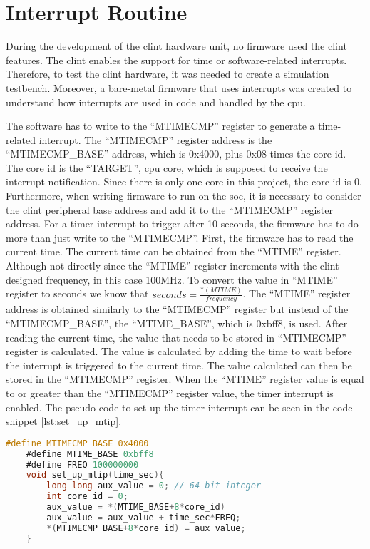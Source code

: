 \section{Interrupt Routine}
\label{section:barebones_interrupt_routine}
During the development of the \acrshort{clint} hardware unit, no firmware used the \acrshort{clint} features. The \acrshort{clint} enables the support for time or software-related interrupts. Therefore, to test the \acrshort{clint} hardware, it was needed to create a simulation testbench. Moreover, a bare-metal firmware that uses interrupts was created to understand how interrupts are used in code and handled by the \acrshort{cpu}.

The software has to write to the \enquote{MTIMECMP} register to generate a time-related interrupt. The \enquote{MTIMECMP} register address is the \enquote{MTIMECMP\_BASE} address, which is 0x4000, plus 0x08 times the core id. The core id is the \enquote{TARGET}, \acrshort{cpu} core, which is supposed to receive the interrupt notification. Since there is only one core in this project, the core id is 0. Furthermore, when writing firmware to run on the \acrshort{soc}, it is necessary to consider the \acrshort{clint} peripheral base address and add it to the \enquote{MTIMECMP} register address. For a timer interrupt to trigger after 10 seconds, the firmware has to do more than just write to the \enquote{MTIMECMP}. First, the firmware has to read the current time. The current time can be obtained from the \enquote{MTIME} register. Although not directly since the \enquote{MTIME} register increments with the \acrshort{clint} designed frequency, in this case 100MHz. To convert the value in \enquote{MTIME} register to seconds we know that $seconds=\frac{*(MTIME)}{frequency}$. The \enquote{MTIME} register address is obtained similarly to the \enquote{MTIMECMP} register but instead of the \enquote{MTIMECMP\_BASE}, the \enquote{MTIME\_BASE}, which is 0xbff8, is used. After reading the current time, the value that needs to be stored in \enquote{MTIMECMP} register is calculated. The value is calculated by adding the time to wait before the interrupt is triggered to the current time. The value calculated can then be stored in the \enquote{MTIMECMP} register. When the \enquote{MTIME} register value is equal to or greater than the \enquote{MTIMECMP} register value, the timer interrupt is enabled. The pseudo-code to set up the timer interrupt can be seen in the code snippet \ref*{lst:set_up_mtip}.

\begin{lstlisting}[language=C, caption={Set Up Timer Interrupt.}, label=lst:set_up_mtip]
    #define MTIMECMP_BASE 0x4000
    #define MTIME_BASE 0xbff8
    #define FREQ 100000000
    void set_up_mtip(time_sec){
        long long aux_value = 0; // 64-bit integer
        int core_id = 0;
        aux_value = *(MTIME_BASE+8*core_id)
        aux_value = aux_value + time_sec*FREQ;
        *(MTIMECMP_BASE+8*core_id) = aux_value;
    }
\end{lstlisting}

